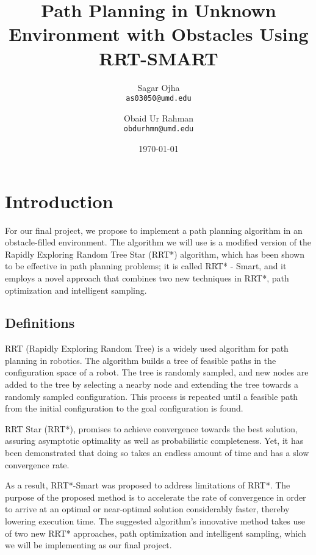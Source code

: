 \documentclass[12pt]{extarticle}
\title{Path Planning in Unknown Environment with Obstacles Using RRT-SMART}
\author{
	Sagar Ojha \\
	\texttt{as03050@umd.edu}
	\and
	Obaid Ur Rahman\\
	\texttt{obdurhmn@umd.edu}}
\date{\today}
\begin{document}
\maketitle
\newpage
\section{Introduction}
\hspace{\parindent}For our final project, we propose to implement a path planning algorithm in an obstacle-filled environment. The algorithm we will use is a modified version of the Rapidly Exploring Random Tree Star (RRT*) algorithm, which has been shown to be effective in path planning problems; it is called RRT* - Smart, and it employs a novel approach that combines two new techniques in RRT*, path optimization and intelligent sampling.


\subsection{Definitions}
\hspace{\parindent}RRT (Rapidly Exploring Random Tree) is a widely used algorithm for path planning in robotics. The algorithm builds a tree of feasible paths in the configuration space of a robot. The tree is randomly sampled, and new nodes are added to the tree by selecting a nearby node and extending the tree towards a randomly sampled configuration. This process is repeated until a feasible path from the initial configuration to the goal configuration is found.

RRT Star (RRT*), promises to achieve convergence towards the best solution, assuring asymptotic optimality as well as probabilistic completeness. Yet, it has been demonstrated that doing so takes an endless amount of time and has a slow convergence rate.

As a result, RRT*-Smart was proposed to address limitations of RRT*. The purpose of the proposed method is to accelerate the rate of convergence in order to arrive at an optimal or near-optimal solution considerably faster, thereby lowering execution time. The suggested algorithm's innovative method takes use of two new RRT* approaches, path optimization and intelligent sampling, which we will be implementing as our final project.
\end{document}
